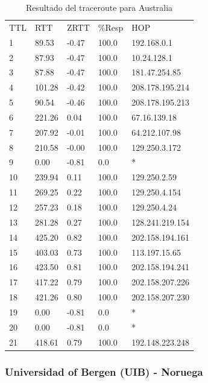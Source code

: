 \begin{table}[H]
    \begin{tabular}{lllll}
    TTL & RTT    & ZRTT  & \%Resp & HOP             \\
    1   & 89.53  & -0.47 & 100.0  & 192.168.0.1     \\
    2   & 87.93  & -0.47 & 100.0  & 10.24.128.1     \\
    3   & 87.88  & -0.47 & 100.0  & 181.47.254.85   \\
    4   & 101.28 & -0.42 & 100.0  & 208.178.195.214 \\
    5   & 90.54  & -0.46 & 100.0  & 208.178.195.213 \\
    6   & 221.26 & 0.04  & 100.0  & 67.16.139.18    \\
    7   & 207.92 & -0.01 & 100.0  & 64.212.107.98   \\
    8   & 210.58 & -0.00 & 100.0  & 129.250.3.172   \\
    9   & 0.00   & -0.81 & 0.0    & *               \\
    10  & 239.94 & 0.11  & 100.0  & 129.250.2.59    \\
    11  & 269.25 & 0.22  & 100.0  & 129.250.4.154   \\
    12  & 257.23 & 0.18  & 100.0  & 129.250.4.24    \\
    13  & 281.28 & 0.27  & 100.0  & 128.241.219.154 \\
    14  & 425.20 & 0.82  & 100.0  & 202.158.194.161 \\
    15  & 403.03 & 0.73  & 100.0  & 113.197.15.65   \\
    16  & 423.50 & 0.81  & 100.0  & 202.158.194.241 \\
    17  & 417.22 & 0.79  & 100.0  & 202.158.207.226 \\
    18  & 421.26 & 0.80  & 100.0  & 202.158.207.230 \\
    19  & 0.00   & -0.81 & 0.0    & *               \\
    20  & 0.00   & -0.81 & 0.0    & *               \\
    21  & 418.61 & 0.79  & 100.0  & 192.148.223.248 \\
    \end{tabular}
    \caption{Resultado del traceroute para Australia}
  \label{fig:tabla-aus}
\end{table}

\subsubsection{Universidad of Bergen (UIB) - Noruega}

